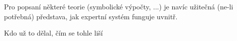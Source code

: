 \begin{framed}
  Pro popsaní některé teorie (symbolické výpočty, ...) je navíc užitečná (ne-li
  potřebná) představa, jak expertní systém funguje uvnitř.
\end{framed}

\begin{framed}
  Kdo už to dělal, čím se tohle liší
\end{framed}

